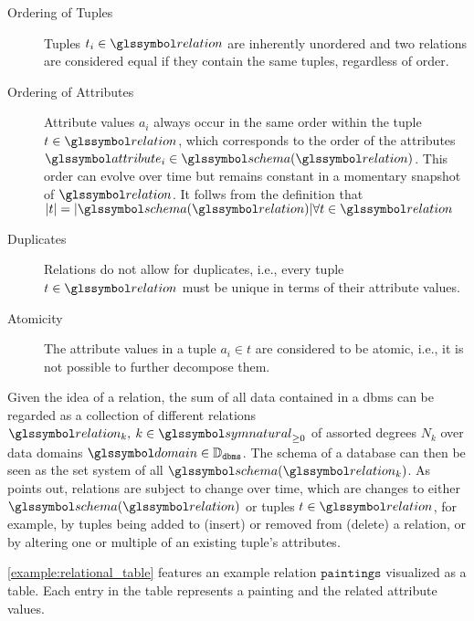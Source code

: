 \begin{description}
    \item[Ordering of Tuples] Tuples $t_i \in \relation$ are inherently unordered and two relations are considered equal if they contain the same tuples, regardless of order.
    \item[Ordering of Attributes] Attribute values $a_{i}$ always occur in the same order within the tuple $t \in \relation$, which corresponds to the order of the attributes $\attribute_i \in \schema(\relation)$. This order can evolve over time but remains constant in a momentary snapshot of $\relation$. It follws from the definition that $|t| = |\schema(\relation)| \forall t \in \relation$
    \item[Duplicates] Relations do not allow for duplicates, i.e., every tuple $t \in \relation$ must be unique in terms of their attribute values.
    \item[Atomicity] The attribute values in a tuple $a_i \in t$ are considered to be atomic, i.e., it is not possible to further decompose them.
\end{description}

Given the idea of a relation, the sum of all data contained in a \acrshort{dbms} can be regarded as a collection of different relations $\relation_k, \: k \in \symnatural_{\geq 0}$ of assorted degrees $N_k$ over data domains $\domain \in \mathbb{D}_{\mathtt{dbms}}$. The schema of a database can then be seen as the set system of all $\schema(\relation_k)$. As \cite{Codd:1970Relational} points out, relations are subject to change over time, which are changes to either $\schema(\relation)$ or tuples $t \in \relation$, for example, by tuples being added to (insert) or removed from (delete) a relation, or by altering one or multiple of an existing tuple's attributes.

\cref{example:relational_table} features an example relation $\mathtt{paintings}$ visualized as a table. Each entry in the table represents a painting and the related attribute values.

